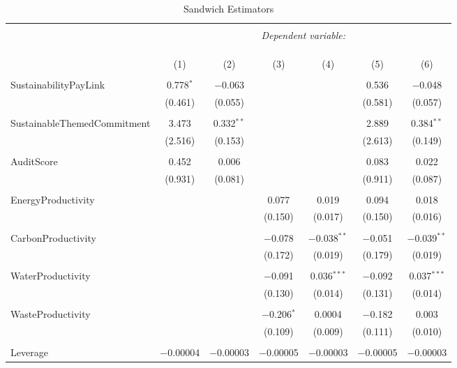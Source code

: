 \documentclass[]{article}
\begin{document}
\begin{table}[h] \centering 
  \caption{Sandwich Estimators} 
  \label{Sand} 
\begin{tabular}{@{\extracolsep{1pt}}lcccccc} 
\\[-1.8ex]\hline 
\hline \\[-1.8ex] 
 & \multicolumn{6}{c}{\textit{Dependent variable:}} \\ 
\cline{2-7} 
\\[-1.8ex] & \multicolumn{6}{c}{ } \\ 
\\[-1.8ex] & (1) & (2) & (3) & (4) & (5) & (6)\\ 
\hline \\[-1.8ex] 
 SustainabilityPayLink & 0.778$^{*}$ & $-$0.063 &  &  & 0.536 & $-$0.048 \\ 
  & (0.461) & (0.055) &  &  & (0.581) & (0.057) \\ 
  & & & & & & \\ 
 SustainableThemedCommitment & 3.473 & 0.332$^{**}$ &  &  & 2.889 & 0.384$^{**}$ \\ 
  & (2.516) & (0.153) &  &  & (2.613) & (0.149) \\ 
  & & & & & & \\ 
 AuditScore & 0.452 & 0.006 &  &  & 0.083 & 0.022 \\ 
  & (0.931) & (0.081) &  &  & (0.911) & (0.087) \\ 
  & & & & & & \\ 
 EnergyProductivity &  &  & 0.077 & 0.019 & 0.094 & 0.018 \\ 
  &  &  & (0.150) & (0.017) & (0.150) & (0.016) \\ 
  & & & & & & \\ 
 CarbonProductivity &  &  & $-$0.078 & $-$0.038$^{**}$ & $-$0.051 & $-$0.039$^{**}$ \\ 
  &  &  & (0.172) & (0.019) & (0.179) & (0.019) \\ 
  & & & & & & \\ 
 WaterProductivity &  &  & $-$0.091 & 0.036$^{***}$ & $-$0.092 & 0.037$^{***}$ \\ 
  &  &  & (0.130) & (0.014) & (0.131) & (0.014) \\ 
  & & & & & & \\ 
 WasteProductivity &  &  & $-$0.206$^{*}$ & 0.0004 & $-$0.182 & 0.003 \\ 
  &  &  & (0.109) & (0.009) & (0.111) & (0.010) \\ 
  & & & & & & \\ 
 Leverage & $-$0.00004 & $-$0.00003 & $-$0.00005 & $-$0.00003 & $-$0.00005 & $-$0.00003 \\ 

\end{tabular}
\end{table}
\end{document}
